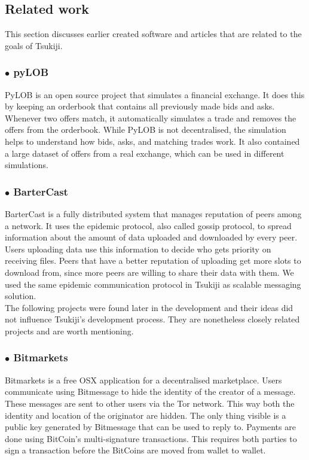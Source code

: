 \subsection{Related work}
This section discusses earlier created software and articles that are related to the goals of Tsukiji.

\subsubsection*{$\bullet$ pyLOB}
PyLOB \cite{pyLOB} is an open source project that simulates a financial exchange.
It does this by keeping an orderbook that contains all previously made bids and asks.
Whenever two offers match, it automatically simulates a trade and removes the offers from the orderbook.
While PyLOB is not decentralised, the simulation helps to understand how bids, asks, and matching trades work.
It also contained a large dataset of offers from a real exchange, which can be used in different simulations.

\subsubsection*{$\bullet$ BarterCast}
BarterCast \cite{bartercast} is a fully distributed system that manages reputation of peers among a network. 
It uses the epidemic protocol, also called gossip protocol, to spread information about the amount of data uploaded and downloaded by every peer.
Users uploading data use this information to decide who gets priority on receiving files.
Peers that have a better reputation of uploading get more slots to download from, since more peers are willing to share their data with them.
We used the same epidemic communication protocol in Tsukiji as scalable messaging solution.\\

The following projects were found later in the development and their ideas did not influence Tsukiji's development process.
They are nonetheless closely related projects and are worth mentioning.

\subsubsection*{$\bullet$ Bitmarkets}
Bitmarkets\cite{bitmarkets} is a free OSX application for a decentralised marketplace.
Users communicate using Bitmessage \cite{bitmessage} to hide the identity of the creator of a message.
These messages are sent to other users via the Tor \cite{tor} network.
This way both the identity and location of the originator are hidden.
The only thing visible is a public key generated by Bitmessage that can be used to reply to.
Payments are done using BitCoin's multi-signature transactions.
This requires both parties to sign a transaction before the BitCoins are moved from wallet to wallet.

